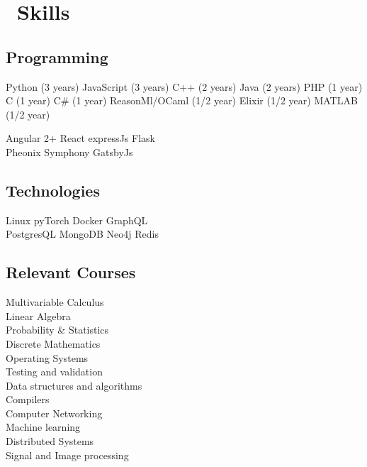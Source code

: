 \section{\faFire \ Skills}

\subsection{Programming}
Python (3 years) \textbullet{}
 JavaScript (3 years) \textbullet{}
 C++ (2 years) \textbullet{}
 Java (2 years) \textbullet{}
 PHP (1 year) \textbullet{}
 C (1 year) \textbullet{}
 C\# (1 year) \textbullet{}
 ReasonMl/OCaml (1/2 year) \textbullet{}
 Elixir (1/2 year) \textbullet{}
 MATLAB (1/2 year) \\

\sectionsep

Angular 2+ \textbullet{}
 React \textbullet{}
 expressJs \textbullet{}
 Flask \\
Pheonix \textbullet{}
 Symphony \textbullet{}
 GatsbyJs \\

\sectionsep

\subsection{Technologies}
Linux \textbullet{}
 pyTorch \textbullet{}
 Docker \textbullet{}
 GraphQL\\
PostgresQL \textbullet{}
 MongoDB  \textbullet{}
 Neo4j \textbullet{}
 Redis\\

\sectionsep

\subsection{Relevant Courses}
Multivariable Calculus\\
Linear Algebra\\
Probability \& Statistics \\
Discrete Mathematics\\
Operating Systems\\ 
Testing and validation\\
Data structures and algorithms\\
Compilers\\
Computer Networking\\
Machine learning\\
Distributed Systems\\
Signal and Image processing\\

